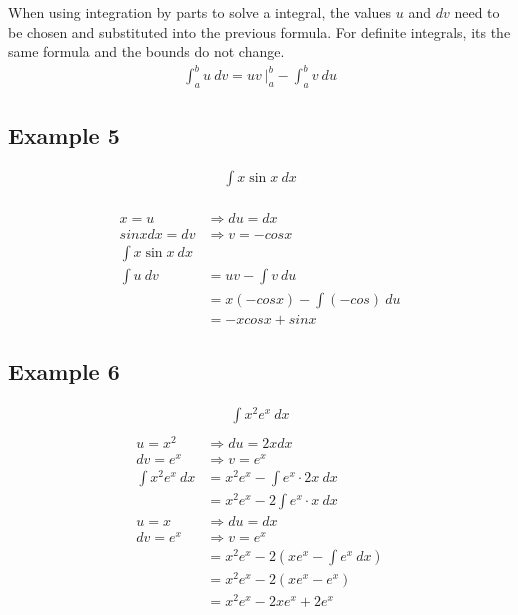 \documentclass{article}
\theoremstyle{mytheoremstyle}
\theoremstyle{mytheoremstyle}
\theoremstyle{myproblemstyle}
\begin{document}
    When using integration by parts to solve a integral, the values $u$ and $dv$
    need to be chosen and substituted into the previous formula. For definite
    integrals, its the same formula and the bounds do not change.
    \begin{align*}
        \int_{a}^{b} u \ dv = uv \ \Big|_{a}^{b} - \int_{a}^{b} v \ du
    \end{align*}

    \subsection*{Example 5}
    \begin{align*}
        \int x\sin x \ dx \\
    \end{align*}

    \begin{align*}
        x = u &\Rightarrow du = dx \\
        sinx dx = dv &\Rightarrow v = -cosx \\
        \int x\sin x \ dx\\
        \int u \ dv
        &= uv - \int v \ du \\
        &= x(-cosx) - \int (-cos) \ du \\
        &= -xcosx + sin x
    \end{align*}

    \subsection*{Example 6}
    \begin{align*}
        \int x^2 e^x \ dx \\
    \end{align*}
    \begin{align*}
        u = x^2 &\Rightarrow du = 2x dx \\
        dv = e^x &\Rightarrow v = e^x \\
        \int x^2 e^x \ dx
        &= x^2 e^x - \int e^x \cdot 2x \ dx \\
        &= x^2 e^x - 2\int e^x \cdot x \ dx \\
        u = x &\Rightarrow du = dx \\
        dv = e^x &\Rightarrow v = e^x \\
        &= x^2 e^x - 2(xe^x - \int e^x \ dx) \\
        &= x^2 e^x - 2(xe^x - e^x) \\
        &= x^2 e^x - 2xe^x + 2e^x
    \end{align*}
\end{document}
